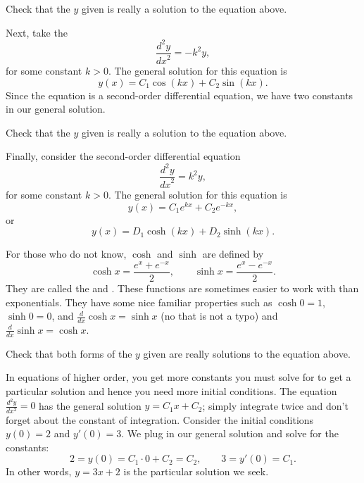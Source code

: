 \begin{exercise}
Check that the $y$ given is really a solution to the equation above.
\end{exercise}

Next, take the
\emph{}
\begin{equation*}
\frac{d^2y}{{dx}^2} = -k^2 y ,
\end{equation*}
for some constant $k > 0$.
The general solution for this equation is
\begin{equation*}
y(x) = C_1 \cos(kx) + C_2 \sin(kx) .
\end{equation*}
Since the equation is a second-order differential equation,
we have two constants in our general solution.

\begin{exercise}
Check that the $y$ given is really a solution to the equation above.
\end{exercise}

Finally, consider the second-order differential equation
\begin{equation*}
\frac{d^2y}{{dx}^2} = k^2 y ,
\end{equation*}
for some constant $k > 0$.
The general solution for this equation is
\begin{equation*}
y(x) = C_1 e^{kx} + C_2 e^{-kx} ,
\end{equation*}
or
\begin{equation*}
y(x) = D_1 \cosh(kx) + D_2 \sinh(kx) .
\end{equation*}

For those who do not know, $\cosh$ and $\sinh$ are defined by
\begin{equation*}
\cosh x = \frac{e^{x} + e^{-x}}{2} , \qquad
\sinh x = \frac{e^{x} - e^{-x}}{2} .
\end{equation*}
They are called the
\emph{}
and
\emph{}.
These functions are sometimes easier to
work with than exponentials.  They have some nice familiar
properties such as
$\cosh 0 = 1$, $\sinh 0 = 0$, and $\frac{d}{dx} \cosh x = \sinh x$ (no that is
not a typo)
and $\frac{d}{dx} \sinh x = \cosh x$.

\begin{exercise}
Check that both forms of the $y$ given are
really solutions to the equation above.
\end{exercise}

\begin{example}
In equations of higher order, you get more constants you must solve for to
get a particular solution and hence you need more initial conditions.
The equation $\frac{d^2y}{dx^2} = 0$ has the
general solution $y = C_1 x + C_2$; simply integrate twice and don't forget
about the constant of integration.  Consider the initial conditions $y(0) =
2$ and $y'(0) = 3$.  We plug in our general solution and solve for the
constants:
\begin{equation*}
2 = y(0) = C_1 \cdot 0 + C_2 = C_2, \qquad
3 = y'(0) = C_1 .
\end{equation*}
In other words, $y = 3x + 2$ is the particular solution we seek.
\end{example}


